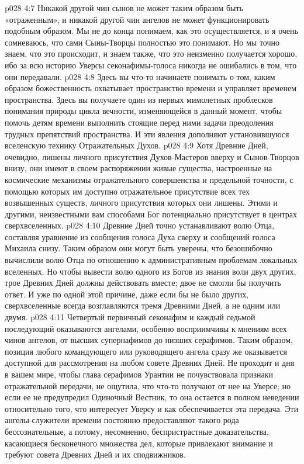 \vs p028 4:7 Никакой другой чин сынов не может таким образом быть «отраженным», и никакой другой чин ангелов не может функционировать подобным образом. Мы не до конца понимаем, как это осуществляется, и я очень сомневаюсь, что сами Сыны\hyp{}Творцы полностью это понимают. Но мы точно знаем, что это происходит, и знаем также, что это неизменно получается хорошо, ибо за всю историю Уверсы секонафимы\hyp{}голоса никогда не ошибались в том, что они передавали.
\vs p028 4:8 Здесь вы что\hyp{}то начинаете понимать о том, каким образом божественность охватывает пространство времени и управляет временем пространства. Здесь вы получаете один из первых мимолетных проблесков понимания природы цикла вечности, изменяющейся в данный момент, чтобы помочь детям времени выполнить стоящие перед ними задачи преодоления трудных препятствий пространства. И эти явления дополняют установившуюся вселенскую технику Отражательных Духов.
\vs p028 4:9 Хотя Древние Дней, очевидно, лишены личного присутствия Духов\hyp{}Мастеров вверху и Сынов\hyp{}Творцов внизу, они имеют в своем распоряжении живые существа, настроенные на космические механизмы отражательного совершенства и предельной точности, с помощью которых им доступно отражательное присутствие всех тех возвышенных существ, личного присутствия которых они лишены. Этими и другими, неизвестными вам способами Бог потенциально присутствует в центрах сверхвселенных.
\vs p028 4:10 Древние Дней точно устанавливают волю Отца, составляя уравнение из сообщения голоса Духа сверху и сообщений голоса Михаила снизу. Таким образом они могут быть уверены, что безошибочно вычислили волю Отца по отношению к административным проблемам локальных вселенных. Но чтобы вывести волю одного из Богов из знания воли двух других, трое Древних Дней должны действовать вместе; двое не смогли бы получить ответ. И уже по одной этой причине, даже если бы не было других, сверхвселенные всегда возглавляются тремя Древними Дней, а не одним или двумя.
\vs p028 4:11 \bibnobreakspace {} Четвертый первичный секонафим и каждый седьмой последующий оказываются ангелами, особенно восприимчивы к мнениям всех чинов ангелов, от высших супернафимов до низших серафимов. Таким образом, позиция любого командующего или руководящего ангела сразу же оказывается доступной для рассмотрения на любом совете Древних Дней. Не проходит и дня в вашем мире, чтобы глава серафимов Урантии не почувствовала признаки отражательной передачи, не ощутила, что что\hyp{}то получают от нее на Уверсе; но если ее не предупредил Одиночный Вестник, то она остается в полном неведении относительно того, что интересует Уверсу и как обеспечивается эта передача. Эти ангелы\hyp{}служители времени постоянно предоставляют такого рода бессознательные, а потому, несомненно, беспристрастные доказательства, касающиеся бесконечного множества дел, которые привлекают внимание и требуют совета Древних Дней и их сподвижников.
